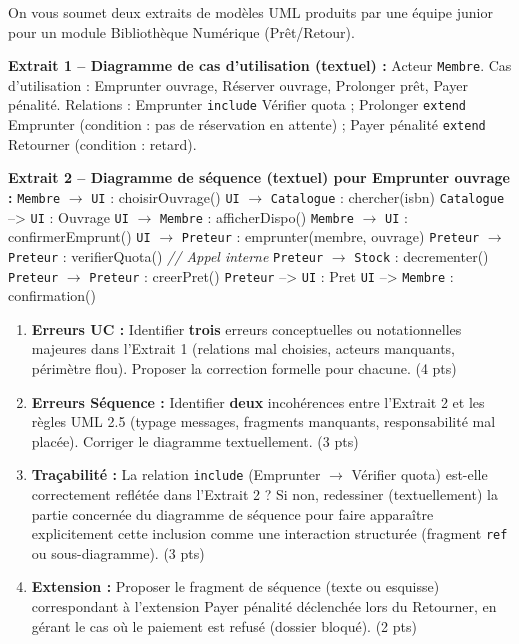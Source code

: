 \documentclass[11pt]{article}
\begin{document}
\begin{exercice}
\label{exo:refactoring}
On vous soumet deux extraits de modèles UML produits par une équipe junior pour un module \og{}Bibliothèque Numérique\fg{} (Prêt/Retour).

\textbf{Extrait 1 -- Diagramme de cas d'utilisation (textuel) :}
Acteur \texttt{Membre}. Cas d'utilisation : \og{}Emprunter ouvrage\fg{}, \og{}Réserver ouvrage\fg{}, \og{}Prolonger prêt\fg{}, \og{}Payer pénalité\fg{}.
Relations : \og{}Emprunter\fg{} \texttt{include} \og{}Vérifier quota\fg{} ; \og{}Prolonger\fg{} \texttt{extend} \og{}Emprunter\fg{} (condition : pas de réservation en attente) ; \og{}Payer pénalité\fg{} \texttt{extend} \og{}Retourner\fg{} (condition : retard).

\textbf{Extrait 2 -- Diagramme de séquence (textuel) pour \og{}Emprunter ouvrage\fg{} :}
\texttt{Membre} $\rightarrow$ \texttt{UI} : choisirOuvrage()
\texttt{UI} $\rightarrow$ \texttt{Catalogue} : chercher(isbn)
\texttt{Catalogue} --> \texttt{UI} : Ouvrage
\texttt{UI} $\rightarrow$ \texttt{Membre} : afficherDispo()
\texttt{Membre} $\rightarrow$ \texttt{UI} : confirmerEmprunt()
\texttt{UI} $\rightarrow$ \texttt{Preteur} : emprunter(membre, ouvrage)
\texttt{Preteur} $\rightarrow$ \texttt{Preteur} : verifierQuota() \textit{// Appel interne}
\texttt{Preteur} $\rightarrow$ \texttt{Stock} : decrementer()
\texttt{Preteur} $\rightarrow$ \texttt{Preteur} : creerPret()
\texttt{Preteur} --> \texttt{UI} : Pret
\texttt{UI} --> \texttt{Membre} : confirmation()

\begin{enumerate}
    \item \textbf{Erreurs UC :} Identifier \textbf{trois} erreurs conceptuelles ou notationnelles majeures dans l'Extrait 1 (relations mal choisies, acteurs manquants, périmètre flou). Proposer la correction formelle pour chacune. (4 pts)
    \item \textbf{Erreurs Séquence :} Identifier \textbf{deux} incohérences entre l'Extrait 2 et les règles UML 2.5 (typage messages, fragments manquants, responsabilité mal placée). Corriger le diagramme textuellement. (3 pts)
    \item \textbf{Traçabilité :} La relation \texttt{include} (\og{}Emprunter\fg{} $\rightarrow$ \og{}Vérifier quota\fg{}) est-elle correctement reflétée dans l'Extrait 2 ? Si non, redessiner (textuellement) la partie concernée du diagramme de séquence pour faire apparaître explicitement cette inclusion comme une interaction structurée (fragment \texttt{ref} ou sous-diagramme). (3 pts)
    \item \textbf{Extension :} Proposer le fragment de séquence (texte ou esquisse) correspondant à l'extension \og{}Payer pénalité\fg{} déclenchée lors du \og{}Retourner\fg{}, en gérant le cas où le paiement est refusé (dossier bloqué). (2 pts)
\end{enumerate}
\end{exercice}
\end{document}
